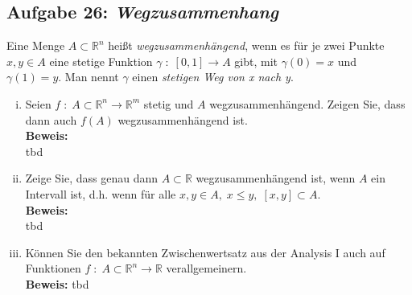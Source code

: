 \subsection*{Aufgabe 26: \mdseries\itshape Wegzusammenhang}
Eine Menge $A \subset \mathbb{R}^n$ heißt \emph{wegzusammenhängend}, wenn es für je zwei Punkte
$x,y \in A$ eine stetige Funktion $\gamma \; : \; [0,1] \rightarrow A$ gibt, mit $\gamma (0) = x$
und $\gamma (1) = y$. Man nennt $\gamma$ einen \emph{stetigen Weg von x nach y}.
\begin{enumerate}[(i)]
    \item Seien $f \; : \; A \subset \mathbb{R}^n \rightarrow \mathbb{R}^m$ stetig und $A$ 
        wegzusammenhängend. Zeigen Sie, dass dann auch $f(A)$ wegzusammenhängend ist.\\
    \textbf{Beweis:}\\
        tbd

    \item Zeige Sie, dass genau dann $A \subset \mathbb{R}$ wegzusammenhängend ist, wenn $A$ 
        ein Intervall ist, d.h. wenn für alle $x,y \in A, \; x\leq y, \;[x,y] \subset A$.\\
    \textbf{Beweis:}\\
        tbd

    \item Können Sie den bekannten Zwischenwertsatz aus der Analysis I auch auf Funktionen
        $f \; : \; A \subset \mathbb{R}^n \rightarrow \mathbb{R}$ verallgemeinern.\\
    \textbf{Beweis:}
        tbd
\end{enumerate}
